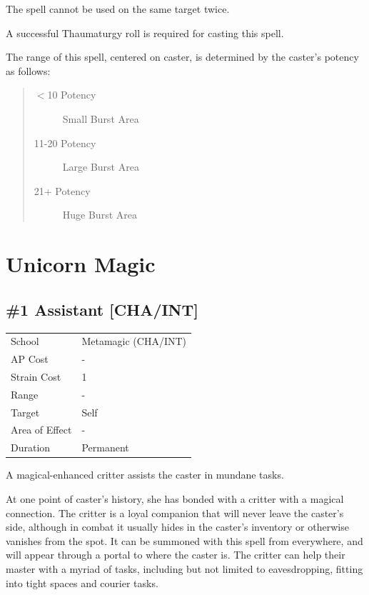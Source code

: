 \documentclass[11pt,a4paper,twocolumn]{book}
\begin{document}
The spell cannot be used on the same target twice.

A successful Thaumaturgy roll is required for casting this spell.

The range of this spell, centered on caster, is determined by the caster's potency as follows:
\begin{quote}
	\begin{description}
		\item[$<$10 Potency] 	Small Burst Area
		\item[11-20 Potency] 	Large Burst Area
		\item[21+ Potency] 	Huge Burst Area
	\end{description}	
\end{quote}   

\chapter{Unicorn Magic}


\section*{\#1 Assistant [CHA/INT]}
{
	\begin{tabu} to 75mm{| X[l,4] | X[l,7] |}
		\hline
		School 			& Metamagic (CHA/INT) 	\\
        AP Cost	      	& - 				\\
        Strain Cost     & 1 				\\
        Range     		& - 				\\
        Target      	& Self 				\\
        Area of Effect  & - 	 			\\
        Duration     	& Permanent 		\\ \hline
	\end{tabu}
		
}

\medskip

A magical-enhanced critter assists the caster in mundane tasks.

At one point of caster's history, she has bonded with a critter with a magical connection. The critter is a loyal companion that will never leave the caster's side, although in combat it usually hides in the caster's inventory or otherwise vanishes from the spot. It can be summoned with this spell from everywhere, and will appear through a portal to where the caster is. The critter can help their master with a myriad of tasks, including but not limited to eavesdropping, fitting into tight spaces and courier tasks.
\end{document}
